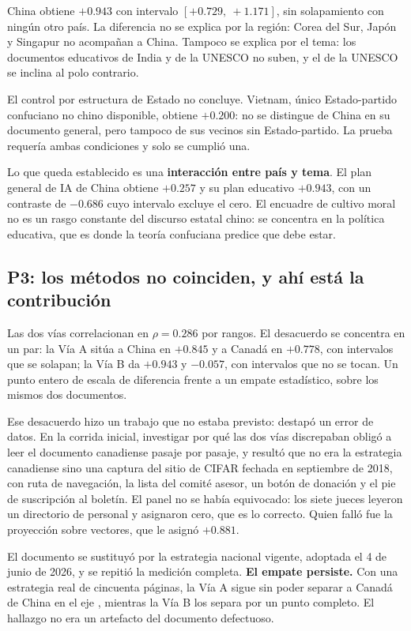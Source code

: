 China obtiene $+0.943$ con intervalo $[+0.729,\ +1.171]$, sin solapamiento con ningún otro país. La diferencia no se explica por la región: Corea del Sur, Japón y Singapur no acompañan a China. Tampoco se explica por el tema: los documentos educativos de India y de la UNESCO no suben, y el de la UNESCO se inclina al polo contrario.

El control por estructura de Estado no concluye. Vietnam, único Estado-partido confuciano no chino disponible, obtiene $+0.200$: no se distingue de China en su documento general, pero tampoco de sus vecinos sin Estado-partido. La prueba requería ambas condiciones y solo se cumplió una.

Lo que queda establecido es una \textbf{interacción entre país y tema}. El plan general de IA de China obtiene $+0.257$ y su plan educativo $+0.943$, con un contraste de $-0.686$ cuyo intervalo excluye el cero. El encuadre de cultivo moral no es un rasgo constante del discurso estatal chino: se concentra en la política educativa, que es donde la teoría confuciana predice que debe estar.

\subsection{P3: los métodos no coinciden, y ahí está la contribución}

Las dos vías correlacionan en $\rho = 0.286$ por rangos. El desacuerdo se concentra en un par: la Vía A sitúa a China en $+0.845$ y a Canadá en $+0.778$, con intervalos que se solapan; la Vía B da $+0.943$ y $-0.057$, con intervalos que no se tocan. Un punto entero de escala de diferencia frente a un empate estadístico, sobre los mismos dos documentos.

Ese desacuerdo hizo un trabajo que no estaba previsto: destapó un error de datos. En la corrida inicial, investigar por qué las dos vías discrepaban obligó a leer el documento canadiense pasaje por pasaje, y resultó que no era la estrategia canadiense sino una captura del sitio de CIFAR fechada en septiembre de 2018, con ruta de navegación, la lista del comité asesor, un botón de donación y el pie de suscripción al boletín. El panel no se había equivocado: los siete jueces leyeron un directorio de personal y asignaron cero, que es lo correcto. Quien falló fue la proyección sobre vectores, que le asignó $+0.881$.

El documento se sustituyó por la estrategia nacional vigente, adoptada el 4 de junio de 2026, y se repitió la medición completa. \textbf{El empate persiste.} Con una estrategia real de cincuenta páginas, la Vía A sigue sin poder separar a Canadá de China en el eje \dezhi, mientras la Vía B los separa por un punto completo. El hallazgo no era un artefacto del documento defectuoso.

